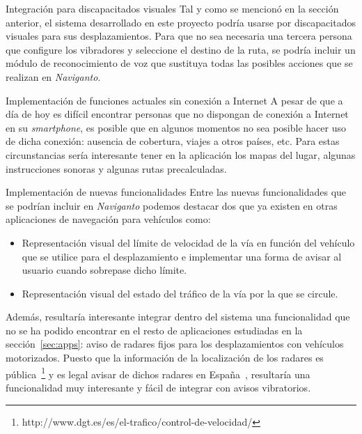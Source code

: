 \begin{definitionlist}
  \item[Integración para discapacitados visuales] Tal y como se mencionó en la sección anterior, el
    sistema desarrollado en este proyecto podría usarse por discapacitados visuales para sus
    desplazamientos. Para que no sea necesaria una tercera persona que configure los vibradores y
    seleccione el destino de la ruta, se podría incluir un módulo de reconocimiento de voz que
    sustituya todas las posibles acciones que se realizan en \emph{Naviganto}.

  \item[Implementación de funciones actuales sin conexión a Internet] A pesar de que a día de hoy es
    difícil encontrar personas que no dispongan de conexión a Internet en su \emph{smartphone}, es
    posible que en algunos momentos no sea posible hacer uso de dicha conexión: ausencia de
    cobertura, viajes a otros países, etc. Para estas circunstancias sería interesante tener en la
    aplicación los mapas del lugar, algunas instrucciones sonoras y algunas rutas precalculadas.

  \item[Implementación de nuevas funcionalidades] Entre las nuevas funcionalidades que se podrían
    incluir en \emph{Naviganto} podemos destacar dos que ya existen en otras aplicaciones de
    navegación para vehículos como:

    \begin{itemize}
      \item Representación visual del límite de velocidad de la vía en función del vehículo que se
        utilice para el desplazamiento e implementar una forma de avisar al usuario cuando sobrepase
        dicho límite.
      \item Representación visual del estado del tráfico de la vía por la que se circule.
    \end{itemize}

    Además, resultaría interesante integrar dentro del sistema una funcionalidad que no se ha podido
    encontrar en el resto de aplicaciones estudiadas en la sección~\ref{sec:apps}: aviso de radares
    fijos para los desplazamientos con vehículos motorizados. Puesto que la información de la
    localización de los radares es
    pública~\footnote{http://www.dgt.es/es/el-trafico/control-de-velocidad/} y es legal avisar de
    dichos radares en España~\cite{Arias14}, resultaría una funcionalidad muy interesante y fácil de
    integrar con avisos vibratorios.


\end{definitionlist}

